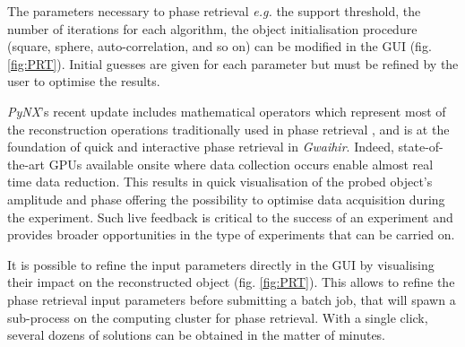
The parameters necessary to phase retrieval \parencite{Fienup1982, Fienup1978, Marchesini2007, FavreNicolin2020} \textit{e.g.} the support threshold, the number of iterations for each algorithm, the object initialisation procedure (square, sphere, auto-correlation, and so on) can be modified in the GUI (fig. \ref{fig:PRT}).
Initial guesses are given for each parameter but must be refined by the user to optimise the results.

\textit{PyNX}'s recent update includes mathematical operators \parencite{FavreNicolin2020} which represent most of the reconstruction operations traditionally used in phase retrieval \parencite{Gerchberg1972, Fienup1978, Marchesini2007}, and is at the foundation of quick and interactive phase retrieval in \textit{Gwaihir}.
Indeed, state-of-the-art GPUs available onsite where data collection occurs enable almost real time data reduction.
This results in quick visualisation of the probed object's amplitude and phase offering the possibility to optimise data acquisition during the experiment.
Such live feedback is critical to the success of an experiment and provides broader opportunities in the type of experiments that can be carried on.

It is possible to refine the input parameters directly in the GUI by visualising their impact on the reconstructed object (fig. \ref{fig:PRT}).
This allows to refine the phase retrieval input parameters before submitting a batch job, that will spawn a sub-process on the computing cluster for phase retrieval.
With a single click, several dozens of solutions can be obtained in the matter of minutes.


